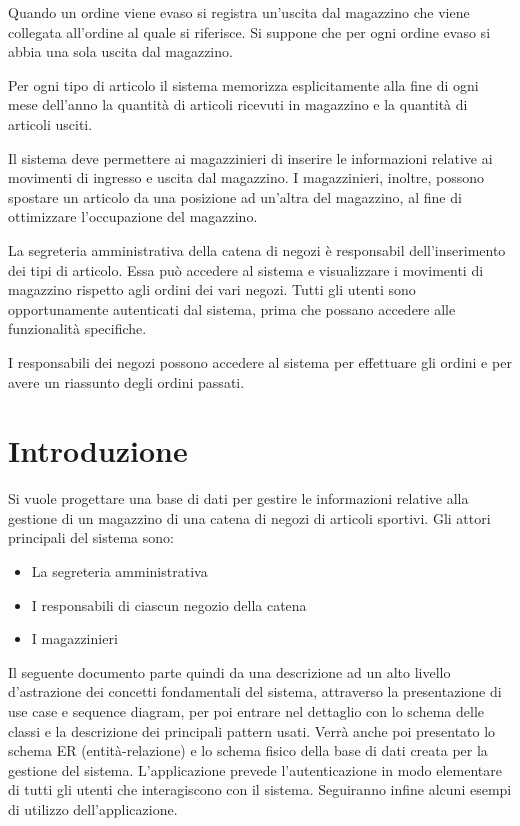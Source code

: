 \documentclass[a4paper]{article}
\begin{document}
	Quando un ordine viene evaso si registra un’uscita dal magazzino che viene collegata all’ordine al quale si riferisce. Si suppone che per ogni ordine evaso si abbia una sola uscita dal magazzino.
	
	Per ogni tipo di articolo il sistema memorizza esplicitamente alla fine di ogni mese dell’anno la quantità di articoli ricevuti in magazzino e la quantità di articoli usciti.
	
	Il sistema deve permettere ai magazzinieri di inserire le informazioni relative ai movimenti di ingresso e uscita dal magazzino. I magazzinieri, inoltre, possono spostare un articolo da una posizione ad un’altra del magazzino, al fine
	di ottimizzare l’occupazione del magazzino.
	
	La segreteria amministrativa della catena di negozi è responsabil dell’inserimento dei tipi di articolo. Essa può accedere al sistema e visualizzare i movimenti di magazzino rispetto agli ordini dei vari negozi. 
	Tutti gli utenti sono opportunamente autenticati dal sistema, prima che possano accedere alle funzionalità specifiche.
	
	I responsabili dei negozi possono accedere al sistema per effettuare gli ordini e per avere un riassunto degli ordini passati.
	

	\section{Introduzione}
	Si vuole progettare una base di dati per gestire le informazioni relative
	alla gestione di un magazzino di una catena di negozi di articoli sportivi.
	Gli attori principali del sistema sono:
	\begin{itemize}
		\item La segreteria amministrativa
		\item I responsabili di ciascun negozio della catena
		\item I magazzinieri
	\end{itemize}
	
	Il seguente documento parte quindi da una descrizione ad un alto livello d'astrazione dei concetti fondamentali del sistema, attraverso la presentazione
	di use case e sequence diagram, per poi entrare nel dettaglio con lo
	schema delle classi e la descrizione dei principali pattern usati.
	Verrà anche poi presentato lo schema ER (entità-relazione) e lo schema fisico
	della base di dati creata per la gestione del sistema.
	L'applicazione prevede l'autenticazione in modo elementare di tutti gli utenti che interagiscono con il sistema.
	Seguiranno infine alcuni esempi di utilizzo dell'applicazione.
\end{document}
